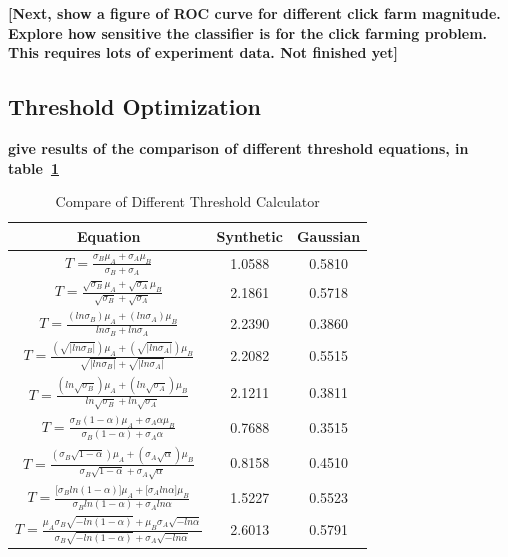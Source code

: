 \documentclass[a4paper]{IEEEtran}
\begin{document}
			\textbf{[Next, show a figure of ROC curve for different click farm magnitude. Explore how sensitive the classifier is for the click farming problem. This requires lots of experiment data. Not finished yet]}
			
		\subsection{Threshold Optimization}
			\textbf{give results of the comparison of different threshold equations, in table~\ref{tab:threshold-comparison}}
			\begin{table}[!ht]
				\centering
				\caption{Compare of Different Threshold Calculator}
				\label{tab:threshold-comparison}
				\begin{tabular}{|c|c|c|}
					\hline
					Equation & Synthetic & Gaussian \\ 
					\hline
					$T = \frac{\sigma_B \mu_A + \sigma_A \mu_B}{\sigma_B + \sigma_A}$& 1.0588 & 0.5810 \\ 
					\hline
					$T = \frac{\sqrt{\sigma_B} \mu_A + \sqrt{\sigma_A} \mu_B}{\sqrt{\sigma_B} + \sqrt{\sigma_A}}$& 2.1861 & 0.5718 \\ 
					\hline
					$T = \frac{(ln\sigma_B)\mu_A + (ln\sigma_A)\mu_B}{ln\sigma_B + ln\sigma_A}$& 2.2390 & 0.3860 \\ 
					\hline
					$T = \frac{(\sqrt{|ln\sigma_B|})\mu_A + (\sqrt{|ln\sigma_A|})\mu_B}{\sqrt{|ln\sigma_B|} + \sqrt{|ln\sigma_A|}}$& 2.2082 & 0.5515 \\ 
					\hline
					$T = \frac{(ln\sqrt{\sigma_B})\mu_A + (ln\sqrt{\sigma_A})\mu_B}{ln\sqrt{\sigma_B} + ln\sqrt{\sigma_A}}$& 2.1211 & 0.3811 \\ 
					\hline
					$T = \frac{\sigma_B (1 - \alpha) \mu_A + \sigma_A \alpha \mu_B}{\sigma_B (1 - \alpha) + \sigma_A \alpha}$& 0.7688 & 0.3515 \\ 
					\hline
					$T = \frac{(\sigma_B \sqrt{1 - \alpha}) \mu_A + (\sigma_A \sqrt{\alpha}) \mu_B}{\sigma_B \sqrt{1 - \alpha} + \sigma_A \sqrt{\alpha}}$& 0.8158 & 0.4510 \\ 
					\hline
					$
					T = \frac{\big[\sigma_B ln(1 - \alpha)\big] \mu_A
						+ \big[\sigma_A ln\alpha\big] \mu_B}
					{\sigma_B ln(1 - \alpha) + \sigma_A ln\alpha}
					$& 1.5227 & 0.5523 \\ 
					\hline
					$
					T = \frac{\mu_A \sigma_B \sqrt{-ln(1 - \alpha)}
						+ \mu_B \sigma_A \sqrt{-ln\alpha}}
					{\sigma_B \sqrt{-ln(1 - \alpha)} + \sigma_A \sqrt{-ln\alpha}}
					$& 2.6013 & 0.5791 \\ 

\end{tabular}
\end{table}
\end{document}
